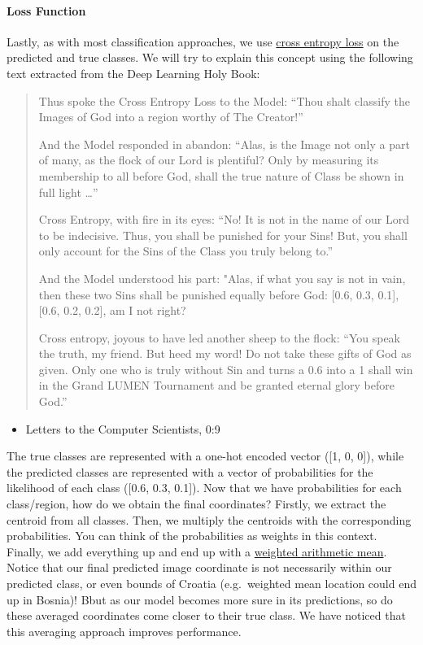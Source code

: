 \documentclass[]{article}
\providecommand{\tightlist}{%
  \setlength{\itemsep}{0pt}\setlength{\parskip}{0pt}}
\let\oldparagraph\paragraph
\renewcommand{\paragraph}[1]{\oldparagraph{#1}\mbox{}}
\begin{document}
\hypertarget{loss-function}{%
\paragraph{Loss Function}\label{loss-function}}

Lastly, as with most classification approaches, we use
\href{https://www.youtube.com/watch?v=6ArSys5qHAU}{cross entropy loss}
on the predicted and true classes. We will try to explain this concept
using the following text extracted from the Deep Learning Holy Book:

\begin{quote}
Thus spoke the Cross Entropy Loss to the Model: ``Thou shalt classify
the Images of God into a region worthy of The Creator!''

And the Model responded in abandon: ``Alas, is the Image not only a part
of many, as the flock of our Lord is plentiful? Only by measuring its
membership to all before God, shall the true nature of Class be shown in
full light \ldots{}''

Cross Entropy, with fire in its eyes: ``No! It is not in the name of our
Lord to be indecisive. Thus, you shall be punished for your Sins! But,
you shall only account for the Sins of the Class you truly belong to.''

And the Model understood his part: "Alas, if what you say is not in
vain, then these two Sins shall be punished equally before God: {[}0.6,
0.3, 0.1{]}, {[}0.6, 0.2, 0.2{]}, am I not right?

Cross entropy, joyous to have led another sheep to the flock: ``You
speak the truth, my friend. But heed my word! Do not take these gifts of
God as given. Only one who is truly without Sin and turns a 0.6 into a 1
shall win in the Grand LUMEN Tournament and be granted eternal glory
before God.''
\end{quote}

\begin{itemize}
\tightlist
\item
  Letters to the Computer Scientists, 0:9
\end{itemize}

The true classes are represented with a one-hot encoded vector ({[}1, 0,
0{]}), while the predicted classes are represented with a vector of
probabilities for the likelihood of each class ({[}0.6, 0.3, 0.1{]}).
Now that we have probabilities for each class/region, how do we obtain
the final coordinates? Firstly, we extract the centroid from all
classes. Then, we multiply the centroids with the corresponding
probabilities. You can think of the probabilities as weights in this
context. Finally, we add everything up and end up with a
\href{https://en.wikipedia.org/wiki/Weighted_arithmetic_mean}{weighted
arithmetic mean}. Notice that our final predicted image coordinate is
not necessarily within our predicted class, or even bounds of Croatia
(e.g.~weighted mean location could end up in Bosnia)! Bbut as our model
becomes more sure in its predictions, so do these averaged coordinates
come closer to their true class. We have noticed that this averaging
approach improves performance.
\end{document}
